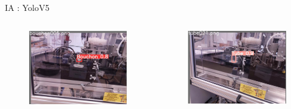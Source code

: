\begin{frame}[allowframebreaks]{IA : YoloV5}
            \begin{columns}
                \begin{column}{0.5\textwidth}
                    \begin{figure}[H]
                        \centering
                        \includegraphics[width=0.9\linewidth]{images/pred_bouchon.png}
                    \end{figure}
                \end{column}\hfill
                \begin{column}{0.5\textwidth}
                    \begin{figure}[H]
                        \centering
                        \includegraphics[width=0.9\linewidth]{images/pred_tube.png}
                    \end{figure}
                \end{column}
            \end{columns}
            

\end{frame}
